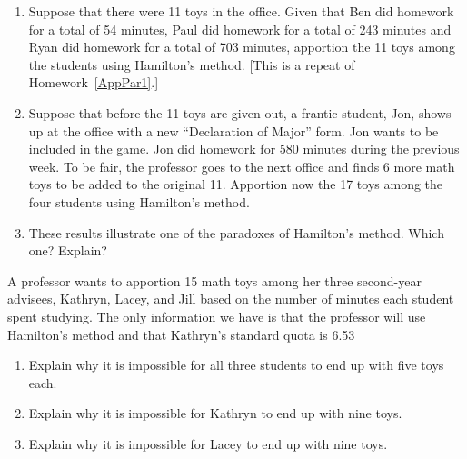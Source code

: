 \begin{Denumerate}
	\hwnewpage
\item \begin{enumerate}
	\item Suppose that there were 11 toys in the office.  Given that Ben did homework for a total of 54 minutes, Paul did homework for a total of 243 minutes and Ryan did homework for a total of 703 minutes, apportion the 11 toys among the students using Hamilton's method.  [This is a repeat of Homework~\ref{AppPar1}.] 
	\vfill 
	\item Suppose that before the 11 toys are given out, a frantic student, Jon, shows up at the office with a new ``Declaration of Major'' form.  Jon wants to be included in the game.  Jon did homework for 580 minutes during the previous week.  To be fair, the professor goes to the next office and finds 6 more math toys to be added to the original 11.  Apportion now the 17 toys among the four students using Hamilton's method. \vfill
		\item These results illustrate one of the paradoxes of Hamilton's method.  Which one?  Explain? 
	\vfill
	\end{enumerate}
	\hwnewpage
	
	\item A professor wants to apportion 15 math toys among her three second-year advisees, Kathryn, Lacey, and Jill based on the number of minutes each student spent studying.  The only information we have is that the professor will use Hamilton's method and that Kathryn's standard quota is 6.53
	\begin{enumerate}
		\item Explain why it is impossible for all three students to end up with five toys each.  \vfill
		\item Explain why it is impossible for Kathryn to end up with nine toys.  \vfill
		\item Explain why it is impossible for Lacey to end up with nine toys.  \vfill
\end{enumerate}
\end{Denumerate} \ENDHOMEWORK

